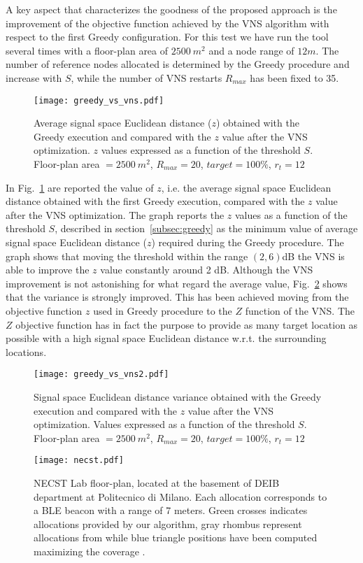 A key aspect that characterizes the goodness of the proposed approach is the improvement of the objective function achieved by the VNS algorithm with respect to the first Greedy configuration. For this test we have run the tool several times with a floor-plan area of $2500~m^2$ and a node range of $12m$. The number of reference nodes allocated is determined by the Greedy procedure and increase with $S$, while the number of VNS restarts $R_{max}$ has been fixed to 35.

\begin{figure}[h!tb]
\centering\texttt{[image: greedy\_vs\_vns.pdf]}
\caption{Average signal space Euclidean distance ($z$) obtained with the Greedy execution and compared with the $z$ value after the VNS optimization. $z$ values expressed as a function of the threshold $S$. Floor-plan area $=2500~m^2$, $R_{max} = 20$, $target = 100\%$, $r_t=12$}
\label{fig:greedy_vns}
\end{figure}

In Fig.~\ref{fig:greedy_vns} are reported the value of $z$, i.e. the average signal space Euclidean distance obtained with the first Greedy execution, compared with the $z$ value after the VNS optimization. The graph reports the $z$ values as a function of the threshold $S$, described in section~\ref{subsec:greedy} as the minimum value of average signal space Euclidean distance ($z$) required during the Greedy procedure. The graph shows that moving the threshold within the range $(2,6)$dB the VNS is able to improve the $z$ value constantly around 2 dB.
Although the VNS improvement is not astonishing for what regard the average value, Fig.~\ref{fig:greedy_vns2} shows that the variance is strongly improved. This has been achieved moving from the objective function $z$ used in Greedy procedure to the $Z$ function of the VNS. The $Z$ objective function has in fact the purpose to provide as many target location as possible with a high signal space Euclidean distance w.r.t. the surrounding locations.

\begin{figure}[h!tb]
\centering\texttt{[image: greedy\_vs\_vns2.pdf]}
\caption{Signal space Euclidean distance variance obtained with the Greedy execution and compared with the $z$ value after the VNS optimization. Values expressed as a function of the threshold $S$. Floor-plan area $=2500~m^2$, $R_{max} = 20$, $target = 100\%$, $r_t=12$}
\label{fig:greedy_vns2}
\end{figure}

\begin{figure}
\centering\texttt{[image: necst.pdf]}
\caption[NECST Lab floor-plan used as indoor environment testbed for deployments evaluation.]{NECST Lab floor-plan, located at the basement of DEIB department at Politecnico di Milano. Each allocation corresponds to a BLE beacon with a range of 7 meters. Green crosses indicates allocations provided by our algorithm, gray rhombus represent allocations from \cite{He2011} while blue triangle positions have been computed maximizing the coverage \cite{Kouakou2010a}.}
\label{fig:necst}
\end{figure}

